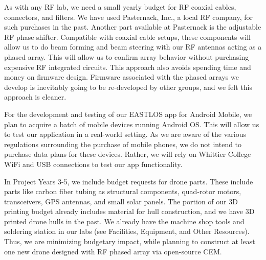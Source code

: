 \documentclass[../../main.tex]{subfiles}
\begin{document}
As with any RF lab, we need a small yearly budget for RF coaxial cables, connectors, and filters.  We have used Pasternack, Inc., a local RF company, for such purchases in the past.  Another part available at Pasternack is the adjustable RF phase shifter.  Compatible with coaxial cable setups, these components will allow us to do beam forming and beam steering with our RF antennas acting as a phased array.  This will allow us to confirm array behavior without purchasing expensive RF integrated circuits.  This approach also avoids spending time and money on firmware design.  Firmware associated with the phased arrays we develop is inevitably going to be re-developed by other groups, and we felt this approach is cleaner. \\ \vspace{2.5mm}

For the development and testing of our EASTLOS app for Android Mobile, we plan to acquire a batch of mobile devices running Android OS.  This will allow us to test our application in a real-world setting.  As we are aware of the various regulations surrounding the purchase of mobile phones, we do not intend to purchase data plans for these devices.  Rather, we will rely on Whittier College WiFi and USB connections to test our app functionality. \\ \vspace{2.5mm}

In Project Years 3-5, we include budget requests for drone parts.  These include parts like carbon fiber tubing as structural components, quad-rotor motors, transceivers, GPS antennas, and small solar panels.  The portion of our 3D printing budget already includes material for hull construction, and we have 3D printed drone hulls in the past.  We already have the machine shop tools and soldering station in our labs (see Facilities, Equipment, and Other Resources).  Thus, we are minimizing budgetary impact, while planning to construct at least one new drone designed with RF phased array via open-source CEM. \\ \vspace{2.5mm}
\end{document}
